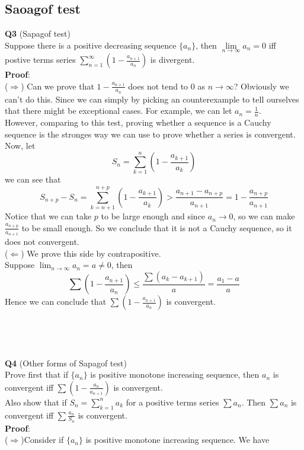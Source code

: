\documentclass{article}
\begin{document}
\subsection{Saoagof test}
\textbf{Q3} (Sapagof test)\\
Suppose there is a positive decreasing sequence $\{a_n\}$, then $\lim\limits_{n \to \infty} a_n = 0$ iff postive terms series
$\sum_{n=1}^{\infty} (1-\frac{a_{n+1}}{a_n})$ is divergent.\\
\textbf{Proof}: \\
($\Longrightarrow$) Can we prove that $1 - \frac{a_{n+1}}{a_n}$ does not tend to 0 as $n \rightarrow \infty$? Obviously we can't do this. Since we can simply by
picking an counterexample to tell ourselves that there might be exceptional cases. For example, we can let $a_n = \frac{1}{n}$.\\
However, comparing to this test, proving whether a sequence is a Cauchy sequence is the stronges way we can use to prove whether a series is convergent.\\
Now, let 
$$
S_n = \sum_{k=1}^{n} (1-\frac{a_{k+1}}{a_k})
$$
we can see that
$$
S_{n+p} - S_n = \sum_{k=n+1}^{n+p}(1-\frac{a_{k+1}}{a_k}) > \frac{a_{n+1}-a_{n+p}}{a_{n+1}} = 1-\frac{a_{n+p}}{a_{n+1}}
$$
Notice that we can take $p$ to be large enough and since $a_n \rightarrow 0$, so we can make $\frac{a_{n+p}}{a_{n+1}}$ to be small enough. So we conclude that 
it is not a Cauchy sequence, so it does not convergent.\\
($\Longleftarrow$) We prove this side by contrapositive.\\
Suppose $\lim_{n \to \infty} a_n = a \ne 0$, then
$$
\sum (1-\frac{a_{n+1}}{a_n}) \leq \frac{\sum (a_k - a_{k+1})}{a} = \frac{a_1 - a }{a}
$$
Hence we can conclude that $\sum (1-\frac{a_{n+1}}{a_n})$ is convergent.\\
\\
\\
\\
\\
\textbf{Q4} (Other forms of Sapagof test) \\
Prove first that if $\{a_n\}$ is positive monotone increasing sequence, then $a_n$ is convergent iff $\sum (1-\frac{a_n}{a_{n+1}})$ is 
convergent.\\
Also show that if $S_n = \sum_{k=1}^{n} a_k$ for a positive terms series $\sum a_n$. Then $\sum a_n$ is convergent iff $\sum \frac{a_n}{S_n}$ is convergent.\\
\textbf{Proof}: \\
($\Longrightarrow$)Consider if $\{a_n\}$ is positive monotone increasing sequence. We have 
\end{document}

